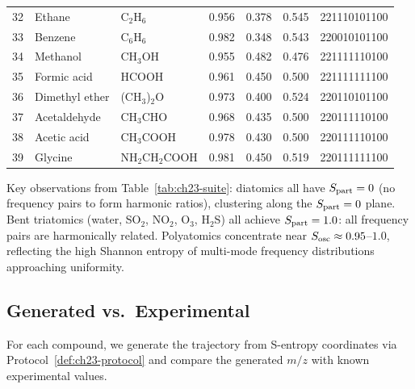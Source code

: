 \begin{table}[htbp]
\begin{tabular}{@{}rllcccl@{}}
32 & Ethane            & C$_2$H$_6$             & 0.956 & 0.378 & 0.545 & 221110101100 \\
33 & Benzene           & C$_6$H$_6$             & 0.982 & 0.348 & 0.543 & 220010101100 \\
34 & Methanol          & CH$_3$OH               & 0.955 & 0.482 & 0.476 & 221111110100 \\
35 & Formic acid       & HCOOH                  & 0.961 & 0.450 & 0.500 & 221111111100 \\
36 & Dimethyl ether    & (CH$_3$)$_2$O          & 0.973 & 0.400 & 0.524 & 220110101100 \\
37 & Acetaldehyde      & CH$_3$CHO              & 0.968 & 0.435 & 0.500 & 220111110100 \\
38 & Acetic acid       & CH$_3$COOH             & 0.978 & 0.430 & 0.500 & 220111110100 \\
39 & Glycine           & NH$_2$CH$_2$COOH       & 0.981 & 0.450 & 0.519 & 220111111100 \\
\bottomrule
\end{tabular}
\end{table}

Key observations from Table~\ref{tab:ch23-suite}: diatomics all have
$S_{\mathrm{part}} = 0$ (no frequency pairs to form harmonic ratios), clustering along the
$S_{\mathrm{part}} = 0$ plane.  Bent triatomics (water, SO$_2$, NO$_2$, O$_3$, H$_2$S)
all achieve $S_{\mathrm{part}} = 1.0$: all frequency pairs are harmonically related.
Polyatomics concentrate near $S_{\mathrm{osc}} \approx 0.95$--$1.0$, reflecting the high
Shannon entropy of multi-mode frequency distributions approaching uniformity.

\subsection{Generated vs.\ Experimental}
\label{sec:ch23-gen-vs-exp}

For each compound, we generate the trajectory from S-entropy coordinates via
Protocol~\ref{def:ch23-protocol} and compare the generated $m/z$ with known
experimental values.

